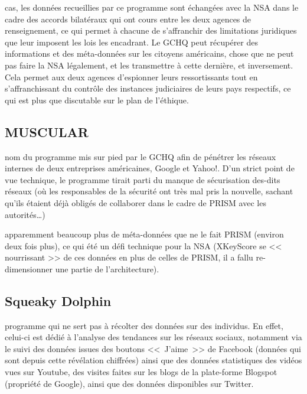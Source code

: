  cas, les données recueillies par ce programme sont
échangées avec la NSA dans le cadre des accords bilatéraux qui ont cours entre
les deux agences de renseignement, ce qui permet à chacune de s'affranchir des
limitations juridiques que leur imposent les lois les encadrant. Le GCHQ peut
récupérer des informations et des méta-données sur les citoyens américains,
chose que ne peut pas faire la NSA légalement, et les transmettre à cette
dernière, et inversement\autocite{echange}. Cela permet aux deux agences d'espionner
leurs ressortissants tout en s'affranchissant du contrôle des instances
judiciaires de leurs pays respectifs, ce qui est plus que discutable sur le plan
de l'éthique.

\subsection{MUSCULAR}

 nom du programme mis sur pied par le GCHQ afin de
pénétrer les réseaux internes de deux entreprises américaines, Google et Yahoo!.
D'un strict point de vue technique, le programme tirait parti du manque de
sécurisation des-dits réseaux\autocite{echange}\autocite{Yahoo} (où les responsables de
la sécurité ont très mal pris la nouvelle, sachant qu'ils étaient déjà obligés de collaborer
dans le cadre de PRISM avec les autorités\ldots)

 apparemment beaucoup plus de méta-données que
ne le fait PRISM (environ deux fois plus\autocite{echange}), ce qui été un défi
technique pour la NSA (XKeyScore se << nourrissant >> de ces données en plus de
celles de PRISM, il a fallu re-dimensionner une partie de l'architecture).

\subsection{Squeaky Dolphin}

 programme qui ne sert pas à récolter des données
sur des individus. En effet, celui-ci est dédié à l'analyse des tendances sur
les réseaux sociaux, notamment via le suivi des données issues des boutons
<<~J'aime~>> de Facebook (données qui sont depuis cette révélation
chiffrées\autocite{fbenc}) ainsi que des données statistiques des vidéos vues sur
Youtube, des visites faites sur les blogs de la plate-forme Blogspot (propriété
de Google), ainsi que des données disponibles sur Twitter.

